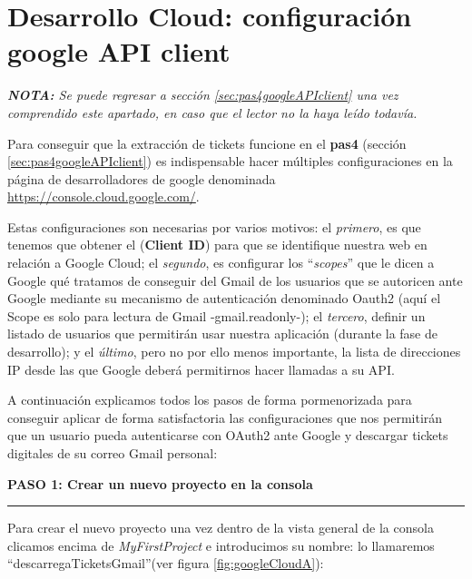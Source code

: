 \documentclass[a4paper,12pt]{report}
\begin{document}
		
		
	\section{Desarrollo Cloud: configuración google API client}
	\label{sec:desarrolloCloudGoogleApi}
	
	\noindent \textit{\textbf{NOTA:} Se puede regresar a sección \ref{sec:pas4googleAPIclient} una vez comprendido este apartado, en caso que el lector no la haya leído todavía.}
	
	Para conseguir que la extracción de tickets funcione en el \textbf{pas4} (sección \ref{sec:pas4googleAPIclient}) es indispensable hacer múltiples configuraciones en la página de desarrolladores de google denominada \href{https://console.cloud.google.com/}{https://console.cloud.google.com/}. 
	
	Estas configuraciones son necesarias por varios motivos: el \textit{primero}, es que tenemos que  obtener el (\textbf{Client ID}) para que se identifique nuestra web en relación a Google Cloud; el \textit{segundo}, es configurar los ``\textit{scopes}'' que le dicen a Google qué tratamos de conseguir del Gmail de los usuarios que se autoricen ante Google mediante su mecanismo de autenticación denominado Oauth2 (aquí el Scope es solo para lectura de Gmail -gmail.readonly-); el \textit{tercero}, definir un listado de usuarios que permitirán usar nuestra aplicación (durante la fase de desarrollo); y el \textit{último}, pero no por ello menos importante, la lista de direcciones IP desde las que Google deberá permitirnos hacer llamadas a su API.
	
	A continuación explicamos todos los pasos de forma pormenorizada para conseguir aplicar de forma satisfactoria las configuraciones que nos permitirán que un usuario pueda autenticarse con OAuth2 ante Google y descargar tickets digitales de su correo Gmail personal:
	
	
	\noindent \textbf{PASO 1: Crear un nuevo proyecto en la consola}
	\vspace{.2em}
	\hrule
	\vspace{.5em}
	
	Para crear  el nuevo proyecto una vez dentro de la vista general de la consola clicamos encima de \textit{MyFirstProject} e introducimos su nombre: lo llamaremos ``descarregaTicketsGmail''(ver figura \ref{fig:googleCloudA}):
	
\end{document}
